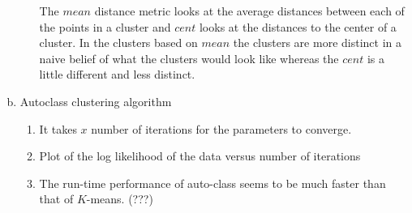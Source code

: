 \documentclass[11pt]{article}
\begin{document}
\begin{enumerate}[a.]
\begin{enumerate}
\begin{enumerate}
\begin{itemize}
	\end{itemize}
\end{enumerate}
The $mean$ distance metric looks at the average distances between each of the points in a cluster and $cent$ looks at the distances to the center of a cluster. In the clusters based on $mean$ the clusters are more distinct in a naive belief of what the clusters would look like whereas the $cent$ is a little different and less distinct.
\end{enumerate}

\item Autoclass clustering algorithm
\begin{enumerate}
\item It takes $x$ number of iterations for the parameters to converge.
\item Plot of the log likelihood of the data versus number of iterations
\item The run-time performance of auto-class seems to be much faster than that of $K$-means. (???)
\end{enumerate}
\end{enumerate}
\end{document}
